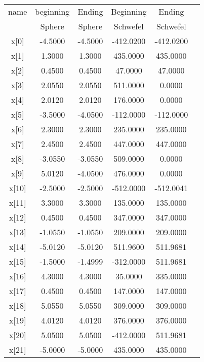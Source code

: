 \documentclass{article}
\begin{document}
\begin{CJK}{UTF8}{gbsn}
\begin{table}[!hbp]  
\begin{tabular}{|c|c|c|c|c|c|}   
\hline %
\hline %
name        & beginning        & Ending            & Beginning     & Ending \\
            & Sphere           & Sphere             & Schwefel      & Schwefel  \\
\hline
x[0]	&	-4.5000	&	-4.5000	&	-412.0200	&	-412.0200	\\
\hline
x[1]	&	 1.3000	&	 1.3000	&	 435.0000	&	 435.0000	\\
\hline
x[2]	&	 0.4500	&	 0.4500	&	  47.0000	&	  47.0000	\\
\hline
x[3]	&	 2.0550	&	 2.0550	&	 511.0000	&	   0.0000	\\
\hline
x[4]	&	 2.0120	&	 2.0120	&	 176.0000	&	   0.0000	\\
\hline
x[5]	&	-3.5000	&	-4.0500	&	-112.0000	&	-112.0000	\\
\hline
x[6]	&	 2.3000	&	 2.3000	&	 235.0000	&	 235.0000	\\
\hline
x[7]	&	 2.4500	&	 2.4500	&	 447.0000	&	 447.0000	\\
\hline
x[8]	&	-3.0550	&	-3.0550	&	 509.0000	&	   0.0000	\\
\hline
x[9]	&	 5.0120	&	-4.0500	&	 476.0000	&	   0.0000	\\
\hline
x[10]	&	-2.5000	&	-2.5000	&	-512.0000	&	-512.0041	\\
\hline
x[11]	&	 3.3000	&	 3.3000	&	 135.0000	&	 135.0000	\\
\hline
x[12]	&	 0.4500	&	 0.4500	&	 347.0000	&	 347.0000	\\
\hline
x[13]	&	-1.0550	&	-1.0550	&	 209.0000	&	 209.0000	\\
\hline
x[14]	&	-5.0120	&	-5.0120	&	 511.9600	&	 511.9681	\\
\hline
x[15]	&	-1.5000	&	-1.4999	&	-312.0000	&	 511.9681	\\
\hline
x[16]	&	 4.3000	&	 4.3000	&	  35.0000	&	 335.0000	\\
\hline
x[17]	&	 0.4500	&	 0.4500	&	 147.0000	&	 147.0000	\\
\hline
x[18]	&	 5.0550	&	 5.0550	&	 309.0000	&	 309.0000	\\
\hline
x[19]	&	 4.0120	&	 4.0120	&	 376.0000	&	 376.0000	\\
\hline
x[20]	&	 5.0500	&	 5.0500	&	-412.0000	&	 511.9681	\\
\hline
x[21]	&	-5.0000	&	-5.0000	&	 435.0000	&	 435.0000	\\

\end{tabular}
\end{table}
\end{CJK}
\end{document}
